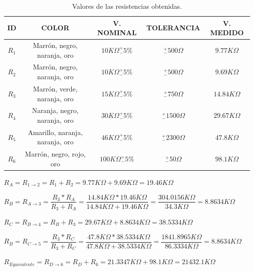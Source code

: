 \documentclass[paper=a4, fontsize=11pt]{scrartcl} %
\numberwithin{equation}{section} %
\numberwithin{figure}{section} %
\numberwithin{table}{section} %
\begin{document}
\begin{table}[H]
	\centering
	\begin{tabular}[scale 0.3]{|c|c|c|c|c|}
		\hline
		\textbf{ID} & \textbf{COLOR} & \textbf{V.
			 NOMINAL} & \textbf{TOLERANCIA} & \textbf{V. MEDIDO} \\
		\hline
		$ R_{1} $ & Marrón, negro, naranja, oro & $10 K \Omega _{-}^{+}5 \% $ & $_{-}^{+}500 \Omega $ & $9.77K \Omega $ \\
		$ R_{2} $ & Marrón, negro, naranja, oro & $10 K \Omega _{-}^{+}5 \% $ & $_{-}^{+}500 \Omega $ & $9.69K \Omega $ \\
		$ R_{3} $ & Marrón, verde, naranja, oro & $15 K \Omega _{-}^{+}5 \% $ & $_{-}^{+}750 \Omega $ & $14.84K \Omega $ \\
		$ R_{4} $ & Naranja, negro, naranja, oro & $30 K \Omega _{-}^{+}5 \% $ & $_{-}^{+}1500 \Omega $ & $29.67K \Omega $ \\
		$ R_{5} $ & Amarillo, naranja, naranja, oro & $46 K \Omega _{-}^{+}5 \% $ & $_{-}^{+}2300 \Omega $ & $47.8K \Omega $\\	
		$ R_{6} $ & Marrón, negro, rojo, oro & $100 K \Omega _{-}^{+}5 \% $ & $_{-}^{+}50 \Omega $ & $98.1K \Omega $\\	
		\hline
	\end{tabular}  
	\caption{Valores de las resistencias obtenidas.} \label{Resistencias}
\end{table}

$ R_{A} = R_{1 \rightarrow 2} = R_{1} + R_{2} = 9.77K \Omega + 9.69K \Omega = 19.46K \Omega $ \newline

$ R_{B} = R_{A \rightarrow 3} = \dfrac{ R_{3} * R_{A} }{ { R_{3} + R_{A} } } = \dfrac{14.84K \Omega * 19.46K \Omega}{14.84K \Omega + 19.46K \Omega} = \dfrac{304.0156K \Omega}{34.3K \Omega} = 8.8634K \Omega $ \newline

$ R_{C} = R_{B \rightarrow 4} = R_{B} + R_{3} = 29.67K \Omega + 8.8634K \Omega = 38.5334K \Omega $ \newline

$ R_{B} = R_{C \rightarrow 5} = \dfrac{ R_{3} * R_{C} }{ { R_{3} + R_{C} } } = \dfrac{47.8K \Omega * 38.5334K \Omega}{47.8K \Omega + 38.5334K \Omega} = \dfrac{1841.8965K \Omega}{86.3334K \Omega} = 8.8634K \Omega $ \newline

$ R_{Equivalente} = R_{D \rightarrow 6} = R_{D} + R_{6} = 21.3347K \Omega + 98.1K \Omega = 21432.1K \Omega $ \newline
\end{document}
